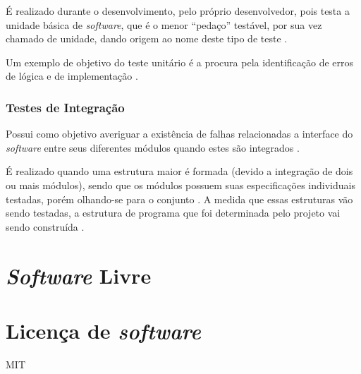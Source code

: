         É realizado durante o desenvolvimento, pelo próprio desenvolvedor, pois testa a unidade básica de \textit{software}, que é o menor ``pedaço''  testável, por sua vez chamado de unidade, dando origem ao nome deste tipo de teste \cite{sw_test_tech}.

        Um exemplo de objetivo do teste unitário é a procura pela identificação de erros de lógica e de implementação \cite{maldonado}.

        \subsubsection{Testes de Integração}
        Possui como objetivo averiguar a existência de falhas relacionadas a interface do \textit{software} entre seus diferentes módulos quando estes são integrados \cite{artigo_intro_teste}.

        É realizado quando uma estrutura maior é formada (devido a integração de dois ou mais módulos), sendo que os módulos possuem suas especificações individuais testadas, porém olhando-se para o conjunto \cite{sw_test_tech}. A medida que essas estruturas vão sendo testadas, a estrutura de programa que foi determinada pelo projeto vai sendo construída \cite{maldonado}.

\section{\textit{Software} Livre}

\section{Licença de \textit{software}}
MIT